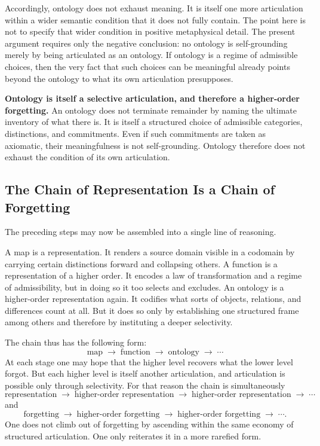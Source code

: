 \documentclass[11pt,a4paper]{article}
\newenvironment{keybox}[1]{%
  \Needspace*{8\baselineskip}%
  \begin{tcolorbox}[
    enhanced,
    breakable=false,
    colback=blue!5,
    colframe=blue!45!black,
    coltitle=black,
    colbacktitle=blue!14,
    boxrule=0.85pt,
    arc=2.5pt,
    left=9pt, right=9pt, top=6pt, bottom=6pt,
    titlerule=0.55pt,
    fonttitle=\bfseries,
    title={#1},
    before upper=\raggedright,
    before skip=0.9\baselineskip,
    after skip=0.9\baselineskip
  ]%
}{%
  \end{tcolorbox}%
}
\theoremstyle{plain}
\theoremstyle{definition}
\theoremstyle{remark}
\begin{document}
Accordingly, ontology does not exhaust meaning. It is itself one more articulation within a wider semantic condition that it does not fully contain. The point here is not to specify that wider condition in positive metaphysical detail. The present argument requires only the negative conclusion: no ontology is self-grounding merely by being articulated as an ontology. If ontology is a regime of admissible choices, then the very fact that such choices can be meaningful already points beyond the ontology to what its own articulation presupposes.

\begin{keybox}{Ontology is selective articulation}
\textbf{Ontology is itself a selective articulation, and therefore a higher-order forgetting.} An ontology does not terminate remainder by naming the ultimate inventory of what there is. It is itself a structured choice of admissible categories, distinctions, and commitments. Even if such commitments are taken as axiomatic, their meaningfulness is not self-grounding. Ontology therefore does not exhaust the condition of its own articulation.
\end{keybox}

\subsection{The Chain of Representation Is a Chain of Forgetting}

The preceding steps may now be assembled into a single line of reasoning.

A map is a representation. It renders a source domain visible in a codomain by carrying certain distinctions forward and collapsing others. A function is a representation of a higher order. It encodes a law of transformation and a regime of admissibility, but in doing so it too selects and excludes. An ontology is a higher-order representation again. It codifies what sorts of objects, relations, and differences count at all. But it does so only by establishing one structured frame among others and therefore by instituting a deeper selectivity.

The chain thus has the following form:
\[
\text{map} \;\longrightarrow\; \text{function} \;\longrightarrow\; \text{ontology} \;\longrightarrow\; \cdots
\]
At each stage one may hope that the higher level recovers what the lower level forgot. But each higher level is itself another articulation, and articulation is possible only through selectivity. For that reason the chain is simultaneously
\[
\text{representation} \;\longrightarrow\; \text{higher-order representation} \;\longrightarrow\; \text{higher-order representation} \;\longrightarrow\; \cdots
\]
and
\[
\text{forgetting} \;\longrightarrow\; \text{higher-order forgetting} \;\longrightarrow\; \text{higher-order forgetting} \;\longrightarrow\; \cdots .
\]
One does not climb out of forgetting by ascending within the same economy of structured articulation. One only reiterates it in a more rarefied form.
\end{document}
